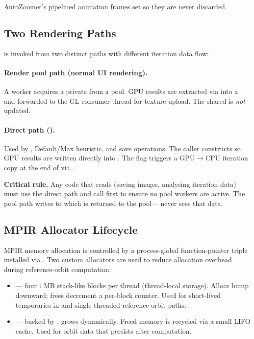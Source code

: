 AutoZoomer's pipelined animation frames set  so they
are never discarded.

\subsection{Two Rendering Paths}
\label{subsec:two-render-paths}

 is invoked from two distinct paths with different iteration
data flow:

\paragraph{Render pool path (normal UI rendering).}
A worker acquires a private  from a pool.  GPU
results are extracted via  into a  and
forwarded to the GL consumer thread for texture upload.  The shared
 is \emph{not} updated.

\paragraph{Direct path ().}
Used by ,  Default/Max heuristic, and save
operations.  The caller constructs
 so GPU results are written directly
into .  The  flag triggers a
GPU\(\to\)CPU iteration copy at the end of  via
.

\textbf{Critical rule.}  Any code that reads  (saving images,
analysing iteration data) must use the direct path and call
 first to ensure no pool workers are active.
The pool path writes to  which is returned to the pool--- never sees that data.

\subsection{MPIR Allocator Lifecycle}
\label{subsec:mpir-allocator-lifecycle}

MPIR memory allocation is controlled by a process-global function-pointer
triple installed via .  Two custom allocators
are used to reduce allocation overhead during reference-orbit computation:

\begin{itemize}
  \item \textbf{} --- four $1\,\mathrm{MB}$
        stack-like blocks per thread (thread-local storage).  Allocs bump
        downward; frees decrement a per-block counter.  Used for short-lived
        temporaries in  and single-threaded reference-orbit
        paths.
  \item \textbf{} --- backed by
        , grows dynamically.  Freed memory is
        recycled via a small LIFO cache.  Used for  orbit
        data that persists after computation.
\end{itemize}

